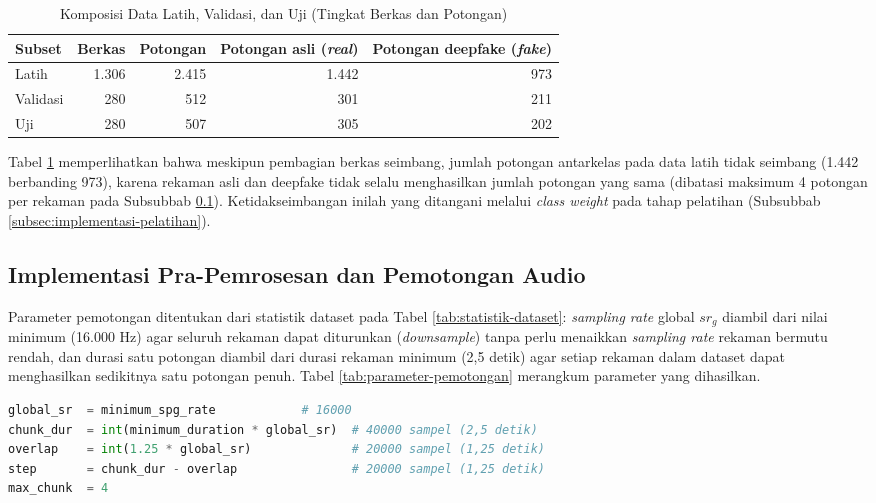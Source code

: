 \begin{table}[htbp]
  \centering
  \caption{Komposisi Data Latih, Validasi, dan Uji (Tingkat Berkas dan Potongan)}
  \label{tab:komposisi-split}
  \begin{tabular}{@{}lrrrr@{}}
    \toprule
    \textbf{Subset} & \textbf{Berkas} & \textbf{Potongan} & \textbf{Potongan asli (\textit{real})} &
    \textbf{Potongan deepfake (\textit{fake})} \\
    \midrule
    Latih & 1.306 & 2.415 & 1.442 & 973 \\
    Validasi & 280 & 512 & 301 & 211 \\
    Uji & 280 & 507 & 305 & 202 \\
    \bottomrule
  \end{tabular}
\end{table}

Tabel \ref{tab:komposisi-split} memperlihatkan bahwa meskipun pembagian berkas
seimbang, jumlah potongan antarkelas pada data latih tidak seimbang (1.442 berbanding
973), karena rekaman asli dan deepfake tidak selalu menghasilkan jumlah potongan
yang sama (dibatasi maksimum 4 potongan per rekaman pada Subsubbab
\ref{subsec:implementasi-pemotongan}). Ketidakseimbangan inilah yang ditangani
melalui \textit{class weight} pada tahap pelatihan (Subsubbab
\ref{subsec:implementasi-pelatihan}).

\subsection{Implementasi Pra-Pemrosesan dan Pemotongan Audio}
\label{subsec:implementasi-pemotongan}

Parameter pemotongan ditentukan dari statistik dataset pada Tabel
\ref{tab:statistik-dataset}: \textit{sampling rate} global $sr_g$ diambil dari nilai
minimum (16.000 Hz) agar seluruh rekaman dapat diturunkan (\textit{downsample})
tanpa perlu menaikkan \textit{sampling rate} rekaman bermutu rendah, dan durasi satu
potongan diambil dari durasi rekaman minimum (2,5 detik) agar setiap rekaman dalam
dataset dapat menghasilkan sedikitnya satu potongan penuh. Tabel
\ref{tab:parameter-pemotongan} merangkum parameter yang dihasilkan.

\begin{lstlisting}[language=Python, caption={Penentuan parameter pemotongan audio}, label={lst:parameter-potong}]
global_sr  = minimum_spg_rate            # 16000
chunk_dur  = int(minimum_duration * global_sr)  # 40000 sampel (2,5 detik)
overlap    = int(1.25 * global_sr)              # 20000 sampel (1,25 detik)
step       = chunk_dur - overlap                # 20000 sampel (1,25 detik)
max_chunk  = 4
\end{lstlisting}

